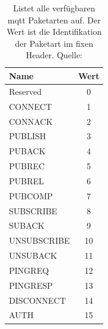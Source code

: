 \begin{table}[h!]
\centering
\renewcommand{\arraystretch}{1.5}
\begin{tabular}{|l|c|}
    \hline
    \textbf{Name} & \textbf{Wert} \\
    \hline
    \hline
    Reserved & 0 \\
    \hline
    CONNECT & 1 \\
    \hline
    CONNACK & 2 \\
    \hline
    PUBLISH & 3 \\
    \hline
    PUBACK & 4 \\
    \hline
    PUBREC & 5 \\
    \hline
    PUBREL & 6 \\
    \hline
    PUBCOMP & 7 \\
    \hline
    SUBSCRIBE & 8 \\
    \hline
    SUBACK & 9 \\
    \hline
    UNSUBSCRIBE & 10 \\
    \hline
    UNSUBACK & 11 \\
    \hline
    PINGREQ & 12 \\
    \hline
    PINGRESP & 13 \\
    \hline
    DISCONNECT & 14 \\
    \hline
    AUTH & 15 \\
    \hline
\end{tabular}
\caption{Listet alle verfügbaren \ac{mqtt} Paketarten auf. Der Wert ist die Identifikation der Paketart im fixen Header. Quelle: \cite{mqtt5Specification}}
\label{table:mqtt-packet-types}
\end{table}

